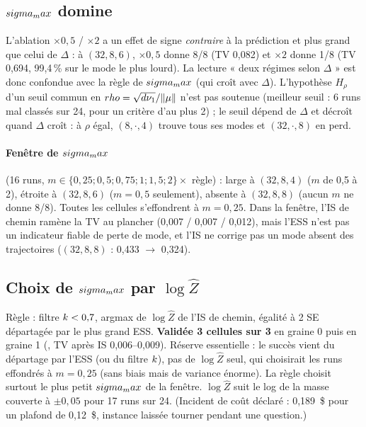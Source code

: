 \subsection{$sigma_max$ domine}
L'ablation $\times0{,}5$ / $\times2$ a un effet de signe \emph{contraire} à la prédiction et plus grand que celui de $\Delta$ : à $(32,8,6)$, $\times0{,}5$ donne 8/8 (TV 0,082) et $\times2$ donne 1/8 (TV 0,694, 99,4\,\% sur le mode le plus lourd). La lecture « deux régimes selon $\Delta$ » est donc confondue avec la règle de $sigma_max$ (qui croît avec $\Delta$). L'hypothèse $H_\rho$ d'un seuil commun en $rho=\sqrt{d\nu_{1}}/\|\mu\|$ n'est pas soutenue (meilleur seuil : 6 runs mal classés sur 24, pour un critère d'au plus 2) ; le seuil dépend de $\Delta$ et décroît quand $\Delta$ croît : à $\rho$ égal, $(8,\cdot,4)$ trouve tous ses modes et $(32,\cdot,8)$ en perd.

\paragraph{Fenêtre de $sigma_max$} (16 runs, $m\in\{0{,}25;0{,}5;0{,}75;1;1{,}5;2\}\times$ règle) : large à $(32,8,4)$ ($m$ de 0,5 à 2), étroite à $(32,8,6)$ ($m=0{,}5$ seulement), absente à $(32,8,8)$ (aucun $m$ ne donne 8/8). Toutes les cellules s'effondrent à $m=0{,}25$. Dans la fenêtre, l'IS de chemin ramène la TV au plancher (0,007 / 0,007 / 0,012), mais l'ESS n'est pas un indicateur fiable de perte de mode, et l'IS ne corrige pas un mode absent des trajectoires ($(32,8,8)$ : 0,433 $\to$ 0,324).

\subsection{Choix de $sigma_max$ par $\log\hat Z$}
Règle : filtre $k<0{,}7$, argmax de $\log\hat Z$ de l'IS de chemin, égalité à 2 SE départagée par le plus grand ESS. \textbf{Validée 3 cellules sur 3} en graine 0 puis en graine 1 (, TV après IS 0,006--0,009). Réserve essentielle : le succès vient du départage par l'ESS (ou du filtre $k$), pas de $\log\hat Z$ seul, qui choisirait les runs effondrés à $m=0{,}25$ (sans biais mais de variance énorme). La règle choisit surtout le plus petit $sigma_max$ de la fenêtre. $\log\hat Z$ suit le log de la masse couverte à $\pm0{,}05$ pour 17 runs sur 24. (Incident de coût déclaré : 0,189~\$ pour un plafond de 0,12~\$, instance laissée tourner pendant une question.)
